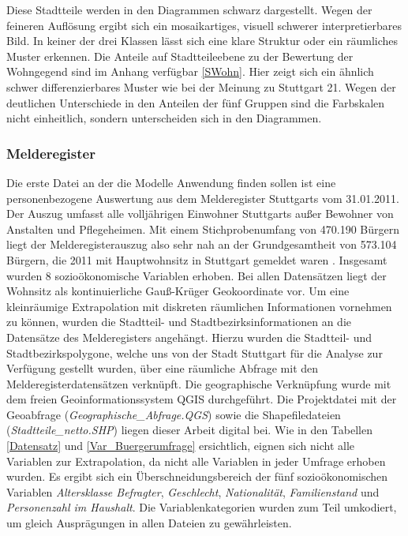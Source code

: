 \documentclass{Vorlage}
\begin{document}
Diese Stadtteile werden in den Diagrammen schwarz dargestellt. Wegen der feineren Auflösung ergibt sich ein 
mosaikartiges, visuell schwerer interpretierbares Bild. In keiner der drei Klassen lässt sich eine klare Struktur oder 
ein räumliches Muster erkennen. Die Anteile auf Stadtteileebene zu der Bewertung der Wohngegend sind im Anhang 
verfügbar \ref{SWohn}. Hier zeigt sich ein ähnlich schwer differenzierbares Muster wie bei der Meinung zu Stuttgart 21. 
Wegen der deutlichen Unterschiede in den Anteilen der fünf Gruppen sind die Farbskalen nicht einheitlich, sondern 
unterscheiden sich in den Diagrammen.\\

\subsubsection{Melderegister}
Die erste Datei an der die Modelle Anwendung finden sollen ist eine personenbezogene Auswertung aus dem Melderegister 
Stuttgarts vom 31.01.2011. Der Auszug umfasst alle volljährigen Einwohner Stuttgarts außer Bewohner von Anstalten und 
Pflegeheimen. Mit einem Stichprobenumfang von 470.190 Bürgern liegt der Melderegisterauszug also sehr nah an 
der Grundgesamtheit von 573.104 Bürgern, die 2011 mit Hauptwohnsitz in Stuttgart gemeldet waren \cite{bundesamt}. Insgesamt wurden 8 sozioökonomische Variablen erhoben. Bei allen Datensätzen liegt der Wohnsitz als 
kontinuierliche Gauß-Krüger Geokoordinate vor. Um eine kleinräumige Extrapolation mit diskreten räumlichen 
Informationen vornehmen zu können, wurden die Stadtteil- und Stadtbezirksinformationen an die Datensätze des 
Melderegisters angehängt. Hierzu wurden die Stadtteil- und Stadtbezirkspolygone, welche uns von der Stadt Stuttgart für 
die Analyse zur Verfügung gestellt wurden, über eine räumliche Abfrage mit den Melderegisterdatensätzen verknüpft. Die 
geographische Verknüpfung wurde mit dem freien Geoinformationssystem QGIS \cite{qgis2016} durchgeführt. Die 
Projektdatei mit der Geoabfrage (\textit{Geographische\_Abfrage.QGS}) sowie die Shapefiledateien 
(\textit{Stadtteile\_netto.SHP}) liegen dieser Arbeit digital bei. Wie in den Tabellen \ref{Datensatz} und 
\ref{Var_Buergerumfrage} ersichtlich, eignen sich nicht alle Variablen zur Extrapolation, da nicht alle Variablen in 
jeder Umfrage erhoben wurden. Es ergibt sich ein Überschneidungsbereich der fünf sozioökonomischen Variablen 
\textit{Altersklasse Befragter}, \textit{Geschlecht}, \textit{Nationalität}, \textit{Familienstand} und 
\textit{Personenzahl im Haushalt}. Die Variablenkategorien wurden zum Teil umkodiert, um gleich Ausprägungen in allen Dateien zu gewährleisten.
\end{document}
